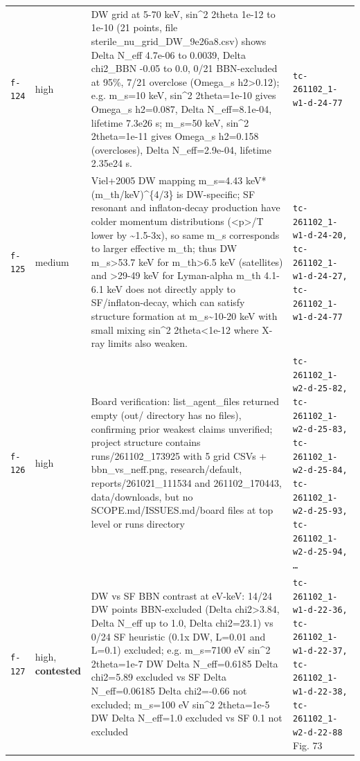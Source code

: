 \documentclass[11pt,a4paper]{article}
\begin{document}
\begin{longtable}{@{}p{}p{}p{}p{}@{}}
\texttt{f-124} & high & DW grid at 5-70 keV, sin\textasciicircum{}2 2theta 1e-12 to 1e-10 (21 points, file sterile\_nu\_grid\_DW\_9e26a8.csv) shows Delta N\_eff 4.7e-06 to 0.0039, Delta chi2\_BBN -0.05 to 0.0, 0/21 BBN-excluded at 95\%, 7/21 overclose (Omega\_s h2\textgreater{}0.12); e.g. m\_s=10 keV, sin\textasciicircum{}2 2theta=1e-10 gives Omega\_s h2=0.087, Delta N\_eff=8.1e-04, lifetime 7.3e26 s; m\_s=50 keV, sin\textasciicircum{}2 2theta=1e-11 gives Omega\_s h2=0.158 (overcloses), Delta N\_eff=2.9e-04, lifetime 2.35e24 s. & \texttt{tc-261102\_\allowbreak{}1-w1-d-24-77} \\
\texttt{f-125} & medium & Viel+2005 DW mapping m\_s=4.43 keV*(m\_th/keV)\textasciicircum{}\{4/3\} is DW-specific; SF resonant and inflaton-decay production have colder momentum distributions (\textless{}p\textgreater{}/T lower by \textasciitilde{}1.5-3x), so same m\_s corresponds to larger effective m\_th; thus DW m\_s\textgreater{}53.7 keV for m\_th\textgreater{}6.5 keV (satellites) and \textgreater{}29-49 keV for Lyman-alpha m\_th 4.1-6.1 keV does not directly apply to SF/inflaton-decay, which can satisfy structure formation at m\_s\textasciitilde{}10-20 keV with small mixing sin\textasciicircum{}2 2theta\textless{}1e-12 where X-ray limits also weaken. & \texttt{tc-261102\_\allowbreak{}1-w1-d-24-20,\allowbreak{} tc-261102\_\allowbreak{}1-w1-d-24-27,\allowbreak{} tc-261102\_\allowbreak{}1-w1-d-24-77} \\
\texttt{f-126} & high & Board verification: list\_agent\_files returned empty (out/ directory has no files), confirming prior weakest claims unverified; project structure contains runs/261102\_173925 with 5 grid CSVs + bbn\_vs\_neff.png, research/default, reports/261021\_111534 and 261102\_170443, data/downloads, but no SCOPE.md/ISSUES.md/board files at top level or runs directory & \texttt{tc-261102\_\allowbreak{}1-w2-d-25-82,\allowbreak{} tc-261102\_\allowbreak{}1-w2-d-25-83,\allowbreak{} tc-261102\_\allowbreak{}1-w2-d-25-84,\allowbreak{} tc-261102\_\allowbreak{}1-w2-d-25-93,\allowbreak{} tc-261102\_\allowbreak{}1-w2-d-25-94,\allowbreak{} \ldots{}\allowbreak{}} \\
\texttt{f-127} & high, \textbf{contested} & DW vs SF BBN contrast at eV-keV: 14/24 DW points BBN-excluded (Delta chi2\textgreater{}3.84, Delta N\_eff up to 1.0, Delta chi2=23.1) vs 0/24 SF heuristic (0.1x DW, L=0.01 and L=0.1) excluded; e.g. m\_s=7100 eV sin\textasciicircum{}2 2theta=1e-7 DW Delta N\_eff=0.6185 Delta chi2=5.89 excluded vs SF Delta N\_eff=0.06185 Delta chi2=-0.66 not excluded; m\_s=100 eV sin\textasciicircum{}2 2theta=1e-5 DW Delta N\_eff=1.0 excluded vs SF 0.1 not excluded & \texttt{tc-261102\_\allowbreak{}1-w1-d-22-36,\allowbreak{} tc-261102\_\allowbreak{}1-w1-d-22-37,\allowbreak{} tc-261102\_\allowbreak{}1-w1-d-22-38,\allowbreak{} tc-261102\_\allowbreak{}1-w2-d-22-88} Fig. 73 \\

\end{longtable}
\end{document}
